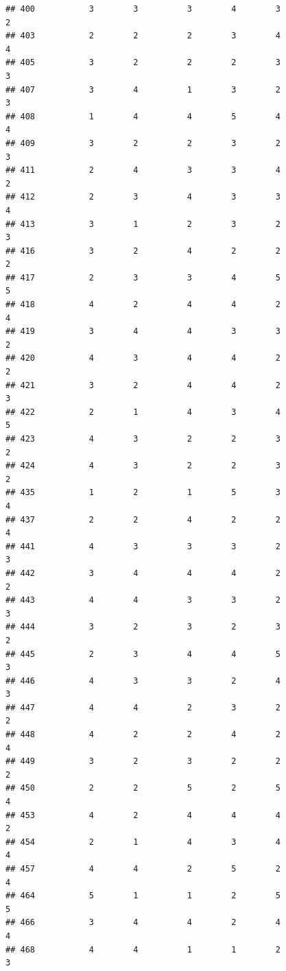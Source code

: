 \documentclass[
]{article}
\begin{document}
\begin{verbatim}
## 400           3        3          3        4        3               2
## 403           2        2          2        3        4               4
## 405           3        2          2        2        3               3
## 407           3        4          1        3        2               3
## 408           1        4          4        5        4               4
## 409           3        2          2        3        2               3
## 411           2        4          3        3        4               2
## 412           2        3          4        3        3               4
## 413           3        1          2        3        2               3
## 416           3        2          4        2        2               2
## 417           2        3          3        4        5               5
## 418           4        2          4        4        2               4
## 419           3        4          4        3        3               2
## 420           4        3          4        4        2               2
## 421           3        2          4        4        2               3
## 422           2        1          4        3        4               5
## 423           4        3          2        2        3               2
## 424           4        3          2        2        3               2
## 435           1        2          1        5        3               4
## 437           2        2          4        2        2               4
## 441           4        3          3        3        2               3
## 442           3        4          4        4        2               2
## 443           4        4          3        3        2               3
## 444           3        2          3        2        3               2
## 445           2        3          4        4        5               3
## 446           4        3          3        2        4               3
## 447           4        4          2        3        2               2
## 448           4        2          2        4        2               4
## 449           3        2          3        2        2               2
## 450           2        2          5        2        5               4
## 453           4        2          4        4        4               2
## 454           2        1          4        3        4               4
## 457           4        4          2        5        2               4
## 464           5        1          1        2        5               5
## 466           3        4          4        2        4               4
## 468           4        4          1        1        2               3

\end{verbatim}
\end{document}
